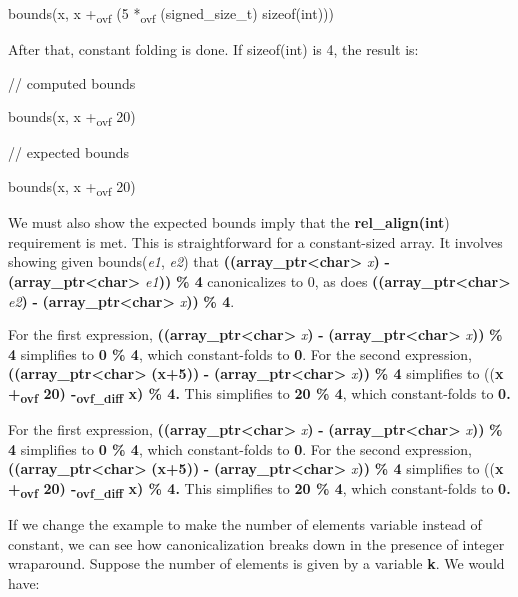 \documentclass[]{article}
\begin{document}
bounds(x, x +\textsubscript{ovf} (5 *\textsubscript{ovf}
(signed\_size\_t) sizeof(int)))

After that, constant folding is done. If sizeof(int) is 4, the result
is:

// computed bounds

bounds(x, x +\textsubscript{ovf} 20)

// expected bounds

bounds(x, x +\textsubscript{ovf} 20)

We must also show the expected bounds imply that the
\textbf{rel\_align(int}) requirement is met. This is straightforward for
a constant-sized array. It involves showing given bounds(\emph{e1},
\emph{e2}) that \textbf{((array\_ptr\textless{}char\textgreater{}}
\emph{x}\textbf{)} \textbf{-}
\textbf{(array\_ptr\textless{}char\textgreater{}} \emph{e1}\textbf{))}
\textbf{\% 4} canonicalizes to 0, as does
\textbf{((array\_ptr\textless{}char\textgreater{}} \emph{e2}\textbf{)}
\textbf{-} \textbf{(array\_ptr\textless{}char\textgreater{}}
\emph{x}\textbf{))} \textbf{\% 4}.

For the first expression,
\textbf{((array\_ptr\textless{}char\textgreater{}} \emph{x}\textbf{)}
\textbf{-} \textbf{(array\_ptr\textless{}char\textgreater{}}
\emph{x}\textbf{))} \textbf{\% 4} simplifies to \textbf{0 \% 4}, which
constant-folds to \textbf{0}. For the second expression,
\textbf{((array\_ptr\textless{}char\textgreater{}} \textbf{(x+5))}
\textbf{-} \textbf{(array\_ptr\textless{}char\textgreater{}}
\emph{x}\textbf{))} \textbf{\% 4} simplifies to ((\textbf{x
+\textsubscript{ovf} 20) -\textsubscript{ovf\_diff} x) \% 4.} This
simplifies to \textbf{20 \% 4}, which constant-folds to \textbf{0.}

For the first expression,
\textbf{((array\_ptr\textless{}char\textgreater{}} \emph{x}\textbf{)}
\textbf{-} \textbf{(array\_ptr\textless{}char\textgreater{}}
\emph{x}\textbf{))} \textbf{\% 4} simplifies to \textbf{0 \% 4}, which
constant-folds to \textbf{0}. For the second expression,
\textbf{((array\_ptr\textless{}char\textgreater{}} \textbf{(x+5))}
\textbf{-} \textbf{(array\_ptr\textless{}char\textgreater{}}
\emph{x}\textbf{))} \textbf{\% 4} simplifies to ((\textbf{x
+\textsubscript{ovf} 20) -\textsubscript{ovf\_diff} x) \% 4.} This
simplifies to \textbf{20 \% 4}, which constant-folds to \textbf{0.}

If we change the example to make the number of elements variable instead
of constant, we can see how canonicalization breaks down in the presence
of integer wraparound. Suppose the number of elements is given by a
variable \textbf{k}. We would have:
\end{document}
